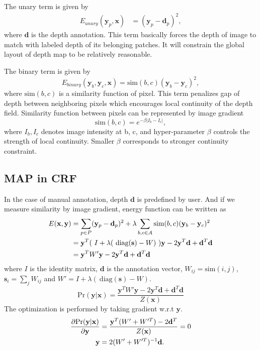 \documentclass[10pt,twocolumn,letterpaper]{article}
\begin{document}
The unary term is given by
\begin{align}
E_{unary}(\mathbf{y}_{p}, \mathbf{x}) &= (\mathbf{y}_p - \mathbf{d}_p)^2,
\end{align}
where $\mathbf{d}$ is the depth annotation. This term basically forces the depth of image to match with labeled depth of its belonging patches. It will constrain the global layout of depth map to be relatively reasonable. 

\par
The binary term is given by
\begin{equation}
E_{binary}(\mathbf{y}_b, \mathbf{y}_c, \mathbf{x}) = \text{sim}(b, c) (\mathbf{y}_b-\mathbf{y}_c)^2,
\end{equation}
where $\text{sim}(b, c)$ is a similarity function of pixel. This term penalizes gap of depth between neighboring pixels which encourages local continuity of the depth field.
Similarity function between pixels can be represented by image gradient
\begin{equation}
\text{sim}(b, c) = e^{-\beta |I_b-I_c|},
\end{equation}
where $I_b, I_c$ denotes image intensity at b, c, and hyper-parameter $\beta$ controls the strength of local continuity. Smaller $\beta$ corresponds to stronger continuity constraint.
\subsection{MAP in CRF}
In the case of manual annotation, depth $\mathbf{d}$ is predefined by user. And if we measure similarity by image gradient, energy function can be written as
\begin{align}
E(\mathbf{x}, \mathbf{y}) &= \sum_{p \in P} (\mathbf{y}_p-\mathbf{d}_p)^2 + \lambda \sum_{b, c \in A}\text{sim}(b, c)(\mathbf{y}_b-\mathbf{y}_c)^2 \notag \\
&= \mathbf{y}^T (\ I+\lambda(\ \text{diag}(\mathbf{s}) - W )\ )\mathbf{y}-2\mathbf{y}^T\mathbf{d}+\mathbf{d}^T\mathbf{d}  \notag
\\ &= \mathbf{y}^T W'\mathbf{y}-2\mathbf{y}^T\mathbf{d}+\mathbf{d}^T\mathbf{d} 
\end{align}
where $I$ is the identity matrix, $\mathbf{d}$ is the annotation vector, $W_{ij} = \text{sim}(i, j) $, $\mathbf{s}_i = \sum_j W_{ij}$ and
$W' = I+\lambda(\ \text{diag}(\mathbf{s}) - W ).$
\begin{equation}
\text{Pr}(\mathbf{y}|\mathbf{x}) = \frac{\mathbf{y}^T W'\mathbf{y}-2\mathbf{y}^T\mathbf{d}+\mathbf{d}^T\mathbf{d} }{Z(\mathbf{x})}
\end{equation}
The optimization is performed by taking gradient w.r.t $\mathbf{y}$.
\begin{align}
\frac{\partial{\text{Pr}(\mathbf{y}|\mathbf{x})}}{\partial\mathbf{y}} &= \frac{\mathbf{y} ^T(W'+W'^T)-2\mathbf{d}^T}{Z(\mathbf{x})} = 0 \notag \\
\mathbf{y} &= 2(W'+W'^T)^{-1}\mathbf{d}.
\end{align}
\end{document}

